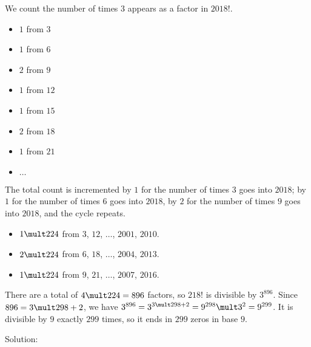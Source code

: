 We count the number of times $3$ appears as a factor in $2018!$.
\begin{itemize}[label={}]
\item $1$ from $3$
\item $1$ from $6$
\item $2$ from $9$
\item $1$ from $12$
\item $1$ from $15$
\item $2$ from $18$
\item $1$ from $21$
\item $\ldots$
\end{itemize}
The total count is incremented by $1$ for the number of times $3$ goes into $2018$; by $1$ for the number of times $6$ goes into $2018$, by $2$ for the number of times $9$ goes into $2018$, and the cycle repeats.
\begin{itemize}[label={}]
\item $1 \mult 224$ from $3$, $12$, $\ldots$, $2001$, $2010$.
\item $2 \mult 224$ from $6$, $18$, $\ldots$, $2004$, $2013$.
\item $1 \mult 224$ from $9$, $21$, $\ldots$, $2007$, $2016$.
\end{itemize}
There are a total of $4 \mult 224 = 896$ factors, so $218!$ is divisible by $3^{896}$. Since $896=3\mult298+2$, we have $3^{896}=3^{3\mult298+2}=9^{298}\mult3^{2}=9^{299}$. It is divisible by $9$ exactly $299$ times, so it ends in $299$ zeros in base $9$.

Solution: 




